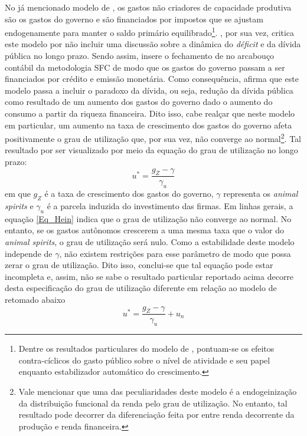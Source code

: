 No já mencionado modelo de \textcite{allain_tackling_2015}, os gastos não criadores de capacidade produtiva são os gastos do governo e são financiados por impostos que se ajustam endogenamente para manter o saldo primário equilibrado\footnote{
	Dentre os resultados particulares do modelo de \textcite{allain_tackling_2015}, pontuam-se os efeitos contra-cíclicos do gasto público sobre o nível de atividade e seu papel enquanto estabilizador automático do crescimento.
}.  
\textcite{hein_autonomous_2018}, por sua vez, critica este modelo por não incluir uma discussão sobre a dinâmica do \textit{déficit} e da dívida pública no longo prazo. 
Sendo assim, insere o fechamento de \textcite{allain_tackling_2015} no arcabouço contábil da metodologia SFC de modo que os gastos do governo passam a ser financiados por crédito e emissão monetária. Como consequência, \textcite{hein_autonomous_2018} afirma que este modelo passa a incluir o paradoxo da dívida, ou seja, redução da dívida pública como resultado de um aumento dos gastos do governo dado o aumento do consumo a partir da riqueza financeira. 
Dito isso, cabe realçar que neste modelo em particular, um aumento na taxa de crescimento dos gastos do governo afeta positivamente o grau de utilização que, por sua vez, não converge ao normal\footnote{
	Vale mencionar que uma das peculiaridades deste modelo é a endogeinização da distribuição funcional da renda pelo grau de utilização. No entanto, tal resultado pode decorrer da diferenciação feita por \textcite{hein_autonomous_2018} entre renda decorrente da produção e renda financeira.
}.
Tal resultado por ser visualizado por meio da equação do grau de utilização no longo prazo:
\begin{equation}
\label{Eq_Hein}
u^* = \frac{g_Z - \gamma}{\gamma_u}
\end{equation}
em que $g_Z$ é a taxa de crescimento dos gastos do governo, $\gamma$ representa os \textit{animal spirits} e $\gamma_u$ é a parcela induzida do investimento das firmas.
Em linhas gerais, a equação \ref{Eq_Hein} indica que o grau de utilização não converge ao normal.
No entanto, se os gastos autônomos crescerem a uma mesma taxa que o valor do \textit{animal spirits}, o grau de utilização será nulo.
Como a estabilidade deste modelo independe de $\gamma$, não existem restrições para esse parâmetro de modo que possa zerar o grau de utilização. Dito isso, conclui-se que tal equação pode estar incompleta e, assim, não se sabe o resultado particular reportado acima decorre desta especificação do grau de utilização diferente em relação ao modelo de \textcite{allain_tackling_2015} retomado abaixo
$$
u^* = \frac{g_Z - \gamma}{\gamma_u} + u_n
$$

